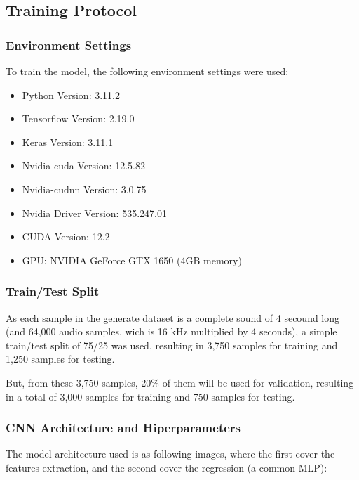 \documentclass[sigconf,natbib=false]{acmart}
\begin{document}
\subsection{Training Protocol}

\subsubsection{Environment Settings}

To train the model, the following environment settings were used:

\begin{itemize}
\item Python Version: 3.11.2
\item Tensorflow Version: 2.19.0
\item Keras Version: 3.11.1
\item Nvidia-cuda Version: 12.5.82
\item Nvidia-cudnn Version: 3.0.75
\item Nvidia Driver Version: 535.247.01
\item CUDA Version: 12.2
\item GPU: NVIDIA GeForce GTX 1650 (4GB memory)
\end{itemize}

\subsubsection{Train/Test Split}

As each sample in the generate dataset is a complete sound of 4 secound long (and 64,000 audio samples, wich is 16 kHz multiplied by 4 seconds), a simple train/test split of 75/25 was used, resulting in 3,750 samples for training and 1,250 samples for testing.

But, from these 3,750 samples, 20\% of them will be used for validation, resulting in a total of 3,000 samples for training and 750 samples for testing.

\subsubsection{CNN Architecture and Hiperparameters}

The model architecture used is as following images, where the first cover the features extraction, and the second cover the regression (a common MLP):
\end{document}
